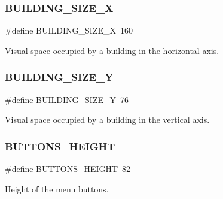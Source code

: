 \subsubsection{\texorpdfstring{B\+U\+I\+L\+D\+I\+N\+G\+\_\+\+S\+I\+Z\+E\+\_\+X}{BUILDING\_SIZE\_X}}
{\footnotesize\ttfamily \#define B\+U\+I\+L\+D\+I\+N\+G\+\_\+\+S\+I\+Z\+E\+\_\+X~160}



Visual space occupied by a building in the horizontal axis. 

\hypertarget{group___b_m_ps_holder_ga40c389b30cd50f3fa1dbcb7a6b3546b4}{}\label{group___b_m_ps_holder_ga40c389b30cd50f3fa1dbcb7a6b3546b4} 
\subsubsection{\texorpdfstring{B\+U\+I\+L\+D\+I\+N\+G\+\_\+\+S\+I\+Z\+E\+\_\+Y}{BUILDING\_SIZE\_Y}}
{\footnotesize\ttfamily \#define B\+U\+I\+L\+D\+I\+N\+G\+\_\+\+S\+I\+Z\+E\+\_\+Y~76}



Visual space occupied by a building in the vertical axis. 

\hypertarget{group___b_m_ps_holder_ga9721e4c146c7397fb06134ef6716d19b}{}\label{group___b_m_ps_holder_ga9721e4c146c7397fb06134ef6716d19b} 
\subsubsection{\texorpdfstring{B\+U\+T\+T\+O\+N\+S\+\_\+\+H\+E\+I\+G\+HT}{BUTTONS\_HEIGHT}}
{\footnotesize\ttfamily \#define B\+U\+T\+T\+O\+N\+S\+\_\+\+H\+E\+I\+G\+HT~82}



Height of the menu buttons. 

\hypertarget{group___b_m_ps_holder_gabdf8cdcc51fec3510df544a673532eaa}{}\label{group___b_m_ps_holder_gabdf8cdcc51fec3510df544a673532eaa} 
